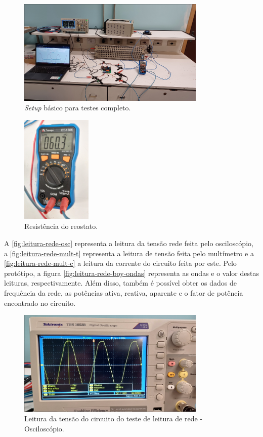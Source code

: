 \begin{figure}[htb!]
    \caption{\textit{Setup} básico para testes completo.}
    \label{fig:setup-main2}
    \includegraphics[width=0.8\textwidth]{figuras/setup-basico-full.png}
    \fonte{}
\end{figure}

\begin{figure}[htb!]
    \caption{Resistência do reostato.}
    \label{fig:resistencia-reostato-teste}
    \includegraphics[width=0.3\textwidth]{figuras/resistencia-reostato-teste.png}
    \fonte{}
\end{figure}

A \autoref{fig:leitura-rede-osc} representa a leitura da tensão rede feita pelo osciloscópio, a \autoref{fig:leitura-rede-mult-t} representa a leitura de tensão feita pelo multímetro e a \autoref{fig:leitura-rede-mult-c} a leitura da corrente do circuito feita por este. Pelo protótipo, a figura \autoref{fig:leitura-rede-boy-ondas} representa as ondas e o valor destas leituras, respectivamente. Além disso, também é possível obter os dados de frequência da rede, as potências ativa, reativa, aparente e o fator de potência encontrado no circuito.

\begin{figure}[htb!]
    \caption{Leitura da tensão do circuito do teste de leitura de rede - Osciloscópio.}
    \label{fig:leitura-rede-osc}
    \includegraphics[width=0.8\textwidth]{figuras/leitura-rede-osc.png}
    \fonte{}
\end{figure}

